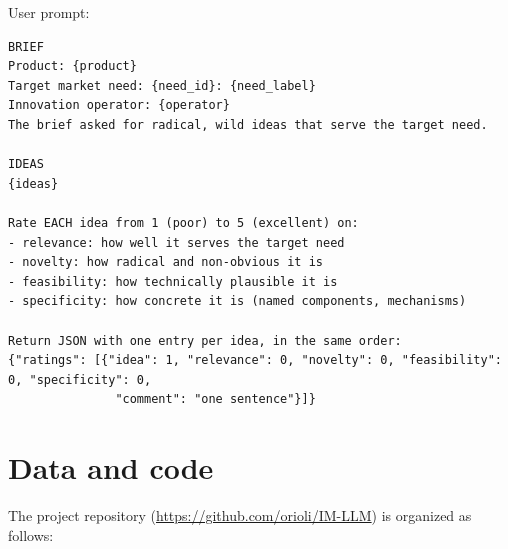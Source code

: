 User prompt:

\begin{verbatim}
BRIEF
Product: {product}
Target market need: {need_id}: {need_label}
Innovation operator: {operator}
The brief asked for radical, wild ideas that serve the target need.

IDEAS
{ideas}

Rate EACH idea from 1 (poor) to 5 (excellent) on:
- relevance: how well it serves the target need
- novelty: how radical and non-obvious it is
- feasibility: how technically plausible it is
- specificity: how concrete it is (named components, mechanisms)

Return JSON with one entry per idea, in the same order:
{"ratings": [{"idea": 1, "relevance": 0, "novelty": 0, "feasibility": 0, "specificity": 0,
               "comment": "one sentence"}]}
\end{verbatim}

\hypertarget{data-and-code}{%
\section{Data and code}\label{data-and-code}}

The project repository (\url{https://github.com/orioli/IM-LLM}) is organized as follows:


